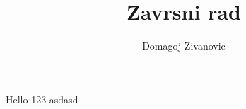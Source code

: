 \documentclass[10pt,a4paper]{article}
\author{Domagoj Zivanovic}
\title{Zavrsni rad}
\begin{document}
Hello 123 asdasd

\begin{figure}
\end{figure}
\end{document}
